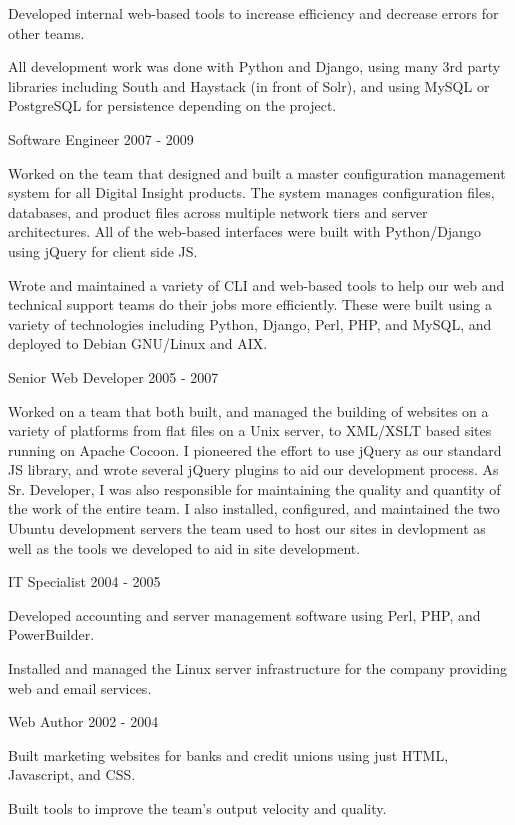 \documentclass[11pt]{article} %
\begin{document}
\begin{description}
\item Developed internal web-based tools to increase efficiency and decrease errors for other teams.

\item All development work was done with Python and Django, using many 3rd party libraries including South and Haystack
(in front of Solr), and using MySQL or PostgreSQL for persistence depending on the project.

           {Software Engineer}
           {2007 - 2009}

\item Worked on the team that designed and built a master configuration management system for all Digital Insight products.
The system manages configuration files, databases, and product files across multiple network tiers and server architectures.
All of the web-based interfaces were built with Python/Django using jQuery for client side JS.

\item Wrote and maintained a variety of CLI and web-based tools to help our web and technical support teams do their jobs more efficiently.
These were built using a variety of technologies including Python, Django, Perl, PHP, and MySQL, and deployed to Debian GNU/Linux and AIX.

           {Senior Web Developer}
           {2005 - 2007}

\item Worked on a team that both built, and managed the building of websites on a variety of platforms from flat files on a Unix server,
to XML/XSLT based sites running on Apache Cocoon. I pioneered the effort to use jQuery as our standard JS library,
and wrote several jQuery plugins to aid our development process. As Sr. Developer, I was also responsible for
maintaining the quality and quantity of the work of the entire team. I also installed, configured, and maintained
the two Ubuntu development servers the team used to host our sites in devlopment as well as the tools we developed
to aid in site development.

           {IT Specialist}
           {2004 - 2005}

\item Developed accounting and server management software using Perl, PHP, and PowerBuilder.

\item Installed and managed the Linux server infrastructure for the company providing web and email services.

           {Web Author}
           {2002 - 2004}

\item Built marketing websites for banks and credit unions using just HTML, Javascript, and CSS.

\item Built tools to improve the team's output velocity and quality.

\end{description}
\end{document}
